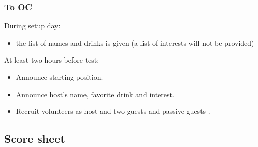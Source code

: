 \subsubsection*{To OC}


During setup day:
\begin{itemize}
	\item  the list of names and drinks is given (a list of interests will not be provided)
\end{itemize}


At least two hours before test:
\begin{itemize}
	\item Announce starting position.
	\item Announce host's name, favorite drink and interest.
	\item Recruit volunteers as host and two guests and passive guests .
\end{itemize}

\subsection*{Score sheet}
